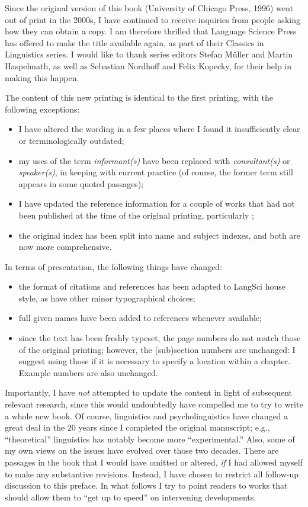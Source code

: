 \begin{refsection}
Since the original version of this book (University of Chicago Press, 1996) went out of print in the 2000s, I have continued to receive inquiries from people asking how they can obtain a copy. I am therefore thrilled that Language Science Press has offered to make the title available again, as part of their Classics in Linguistics series. I would like to thank series editors Stefan Müller and Martin Haspelmath, as well as Sebastian Nordhoff and Felix Kopecky, for their help in making this happen.

The content of this new printing is identical to the first printing, with the following exceptions:
\begin{itemize}
\item I have altered the wording in a few places where I found it insufficiently clear or terminologically outdated;
\item my uses of the term \textit{informant(s)} have been replaced with \textit{consultant(s)} or \textit{speaker(s)}, in keeping with current practice (of course, the former term still appears in some quoted passages);
\item I have updated the reference information for a couple of works that had not been published at the time of the original printing, particularly \citet{Cowart1997};
\item the original index has been split into name and subject indexes, and both are now more comprehensive.
\end{itemize}

\noindent In terms of presentation, the following things have changed: 
\begin{itemize}
\item the format of citations and references has been adapted to LangSci house style, as have other minor typographical choices;
\item full given names have been added to references whenever available;
\item since the text has been freshly typeset, the page numbers do not match those of the original printing; however, the (sub)section numbers are unchanged: I suggest using those if it is necessary to specify a location within a chapter. Example numbers are also unchanged.
\end{itemize}

Importantly, I have \textit{not} attempted to update the content in light of subsequent relevant research, since this would undoubtedly have compelled me to try to write a whole new book. Of course, linguistics and psycholinguistics have chang\-ed a great deal in the 20 years since I  completed the original manuscript; e.g., ``theoretical'' linguistics has notably become more ``experimental.'' Also, some of my own views on the issues have evolved over those two decades. There are passages in the book that I would have omitted or altered, \textit{if} I had allowed myself to make any substantive revisions. Instead, I have chosen to restrict all follow-up discussion to this preface. In what follows I try to point readers to works that should allow them to ``get up to speed'' on intervening developments.


\end{refsection}
